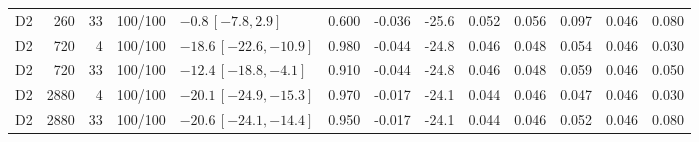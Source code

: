 \documentclass[10pt,a4paper]{article}
\begin{document}
\begin{longtable}{crrcp{33mm}rrrrrrrr}
D2 & 260 & 33 & 100/100 & \(-0.8\,[-7.8,2.9]\) & 0.600 & -0.036 & -25.6 & 0.052 & 0.056 & 0.097 & 0.046 & 0.080\\
D2 & 720 & 4 & 100/100 & \(-18.6\,[-22.6,-10.9]\) & 0.980 & -0.044 & -24.8 & 0.046 & 0.048 & 0.054 & 0.046 & 0.030\\
D2 & 720 & 33 & 100/100 & \(-12.4\,[-18.8,-4.1]\) & 0.910 & -0.044 & -24.8 & 0.046 & 0.048 & 0.059 & 0.046 & 0.050\\
D2 & 2880 & 4 & 100/100 & \(-20.1\,[-24.9,-15.3]\) & 0.970 & -0.017 & -24.1 & 0.044 & 0.046 & 0.047 & 0.046 & 0.030\\
D2 & 2880 & 33 & 100/100 & \(-20.6\,[-24.1,-14.4]\) & 0.950 & -0.017 & -24.1 & 0.044 & 0.046 & 0.052 & 0.046 & 0.080\\
\end{longtable}
\end{document}
